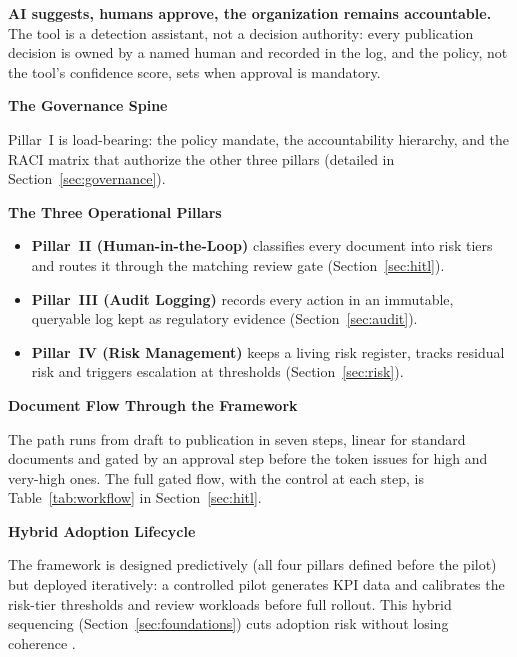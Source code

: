 \documentclass[12pt,a4paper]{article}
\begin{document}
\begin{principlebox}
\textbf{AI suggests, humans approve, the organization remains accountable.} The tool is a detection assistant, not a decision authority: every publication decision is owned by a named human and recorded in the log, and the policy, not the tool's confidence score, sets when approval is mandatory.
\end{principlebox}

\noindent\textbf{The Governance Spine}\par

Pillar~I is load-bearing: the policy mandate, the accountability hierarchy, and the RACI matrix that authorize the other three pillars (detailed in Section~\ref{sec:governance}).

\noindent\textbf{The Three Operational Pillars}\par

\begin{itemize}
  \item \textbf{Pillar~II (Human-in-the-Loop)} classifies every document into risk tiers and routes it through the matching review gate (Section~\ref{sec:hitl}).
  \item \textbf{Pillar~III (Audit Logging)} records every action in an immutable, queryable log kept as regulatory evidence (Section~\ref{sec:audit}).
  \item \textbf{Pillar~IV (Risk Management)} keeps a living risk register, tracks residual risk and triggers escalation at thresholds (Section~\ref{sec:risk}).
\end{itemize}

\noindent\textbf{Document Flow Through the Framework}\par

The path runs from draft to publication in seven steps, linear for standard documents and gated by an approval step before the token issues for high and very-high ones. The full gated flow, with the control at each step, is Table~\ref{tab:workflow} in Section~\ref{sec:hitl}.

\noindent\textbf{Hybrid Adoption Lifecycle}\par

The framework is designed predictively (all four pillars defined before the pilot) but deployed iteratively: a controlled pilot generates KPI data and calibrates the risk-tier thresholds and review workloads before full rollout. This hybrid sequencing (Section~\ref{sec:foundations}) cuts adoption risk without losing coherence \cite{falchi_slides}.
\end{document}

